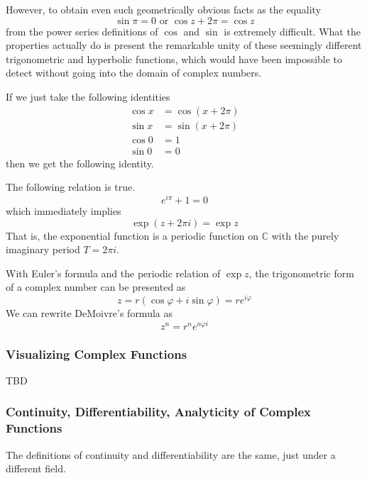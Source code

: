       However, to obtain even such geometrically obvious facts as the equality
      \[\sin{\pi} = 0 \text{ or } \cos{z + 2\pi} = \cos{z}\]
      from the power series definitions of $\cos$ and $\sin$ is extremely difficult. What the properties actually do is present the remarkable unity of these seemingly different trigonometric and hyperbolic functions, which would have been impossible to detect without going into the domain of complex numbers. 

      If we just take the following identities
      \begin{align*}
          \cos{x} & = \cos{(x + 2 \pi)} \\
          \sin{x} & = \sin{(x + 2\pi)} \\
          \cos{0} & = 1 \\
          \sin{0} & = 0
      \end{align*}
      then we get the following identity. 

      \begin{theorem}
      The following relation is true. 
      \[e^{i\pi} + 1 = 0\]
      which immediately implies 
      \[\exp(z + 2\pi i) = \exp{z}\]
      That is, the exponential function is a periodic function on $\mathbb{C}$ with the purely imaginary period $T = 2 \pi i$. 
      \end{theorem}

      \begin{corollary}
      With Euler's formula and the periodic relation of $\exp{z}$, the trigonometric form of a complex number can be presented as
      \[z = r(\cos{\varphi} + i \sin{\varphi}) = r e^{i \varphi}\]
      We can rewrite DeMoivre's formula as
      \[z^n = r^n e^{n \varphi i}\]
      \end{corollary}

      \subsubsection{Visualizing Complex Functions}

        TBD

      \subsubsection{Continuity, Differentiability, Analyticity of Complex Functions}
      The definitions of continuity and differentiability are the same, just under a different field. 

